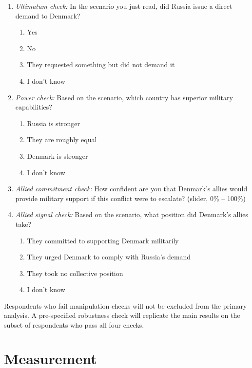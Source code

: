 \begin{enumerate}
    \item \textit{Ultimatum check:} In the scenario you just read, did Russia issue a direct demand to Denmark?
    \begin{enumerate}
        \item Yes
        \item No
        \item They requested something but did not demand it
        \item I don't know
    \end{enumerate}
    \item \textit{Power check:} Based on the scenario, which country has superior military capabilities?
    \begin{enumerate}
        \item Russia is stronger
        \item They are roughly equal
        \item Denmark is stronger
        \item I don't know
    \end{enumerate}
    \item \textit{Allied commitment check:} How confident are you that Denmark's allies would provide military support if this conflict were to escalate? (slider, 0\% -- 100\%)
    \item \textit{Allied signal check:} Based on the scenario, what position did Denmark's allies take?
    \begin{enumerate}
        \item They committed to supporting Denmark militarily
        \item They urged Denmark to comply with Russia's demand
        \item They took no collective position
        \item I don't know
    \end{enumerate}
\end{enumerate}

Respondents who fail manipulation checks will not be excluded from the primary analysis. A pre-specified robustness check will replicate the main results on the subset of respondents who pass all four checks.


\section{Measurement}
\label{sec:measurement}

